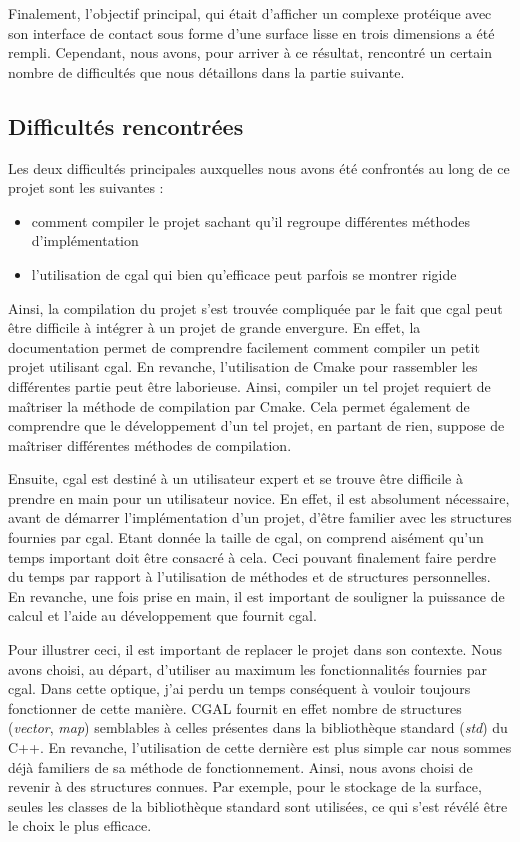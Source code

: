 Finalement, l'objectif principal, qui était d'afficher un complexe protéique avec son
interface de contact sous forme d'une surface lisse en trois dimensions a été rempli.
Cependant, nous avons, pour arriver à ce résultat, rencontré un certain nombre de difficultés que nous
détaillons dans la partie suivante.


\subsection*{Difficultés rencontrées}
Les deux difficultés principales auxquelles nous avons été confrontés au long de ce projet
sont les suivantes :
\begin{itemize}
  \item comment compiler le projet sachant qu'il regroupe différentes méthodes d'implémentation
  \item l'utilisation de \gls{cgal} qui bien qu'efficace peut parfois se montrer rigide
\end{itemize}

Ainsi, la compilation du projet s'est trouvée compliquée par le fait que \gls{cgal} peut être difficile
à intégrer à un projet de grande envergure. En effet, la documentation permet de
comprendre facilement comment compiler un petit projet utilisant \gls{cgal}. En revanche, l'utilisation de Cmake
pour rassembler les différentes partie peut être laborieuse. Ainsi, compiler un tel projet
requiert de maîtriser la méthode de compilation par Cmake. Cela permet également de comprendre
que le développement d'un tel projet, en partant de rien, suppose de maîtriser différentes
méthodes de compilation.

Ensuite, \gls{cgal} est destiné à un utilisateur expert et se trouve être difficile à prendre
en main pour un utilisateur novice. En effet, il est absolument nécessaire, avant de
démarrer l'implémentation d'un projet, d'être familier avec les structures fournies par \gls{cgal}.
Etant donnée la taille de \gls{cgal}, on comprend aisément qu'un temps important doit être
consacré à cela. Ceci pouvant finalement faire perdre du temps par rapport à l'utilisation de méthodes
et de structures personnelles. En revanche, une fois prise en main, il est important de souligner la puissance
de calcul et l'aide au développement que fournit \gls{cgal}.

Pour illustrer ceci, il est important de replacer le projet dans son contexte. Nous avons
choisi, au départ, d'utiliser au maximum les fonctionnalités fournies par \gls{cgal}.
Dans cette optique, j'ai perdu un temps conséquent à vouloir toujours fonctionner de cette manière.
CGAL fournit en effet nombre de structures (\textit{vector}, \textit{map}) semblables
à celles présentes dans la bibliothèque standard (\textit{std}) du C++. En revanche, l'utilisation
de cette dernière est plus simple car nous sommes déjà familiers de sa méthode de fonctionnement.
Ainsi, nous avons choisi de revenir à des structures connues. Par exemple, pour le stockage de la
surface, seules les classes de la bibliothèque standard sont utilisées, ce qui s'est
révélé être le choix le plus efficace.

